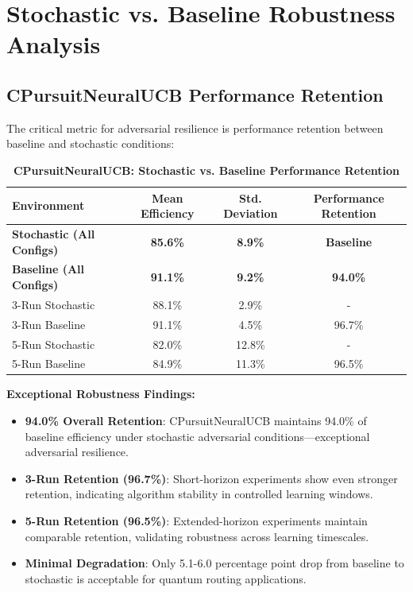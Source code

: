 \documentclass[12pt,a4paper]{article}
\newcommand{\success}[1]{\textcolor{successcolor}{\textbf{#1}}}
\begin{document}
\section{Stochastic vs. Baseline Robustness Analysis}

\subsection{CPursuitNeuralUCB Performance Retention}

The critical metric for adversarial resilience is performance retention between baseline and stochastic conditions:

\begin{table}[H]
\centering
\caption{\success{CPursuitNeuralUCB: Stochastic vs. Baseline Performance Retention}}
\begin{tabular}{|l|c|c|c|}
\hline
\textbf{Environment} & \textbf{Mean Efficiency} & \textbf{Std. Deviation} & \textbf{Performance Retention} \\
\hline
\hline
\success{Stochastic (All Configs)} & \success{85.6\%} & \success{8.9\%} & \success{Baseline} \\
\success{Baseline (All Configs)} & \success{91.1\%} & \success{9.2\%} & \success{94.0\%} \\
\midrule
3-Run Stochastic & 88.1\% & 2.9\% & - \\
3-Run Baseline & 91.1\% & 4.5\% & 96.7\% \\
5-Run Stochastic & 82.0\% & 12.8\% & - \\
5-Run Baseline & 84.9\% & 11.3\% & 96.5\% \\
\hline
\end{tabular}
\end{table}

\textbf{Exceptional Robustness Findings:}
\begin{itemize}
\item \success{94.0\% Overall Retention}: CPursuitNeuralUCB maintains 94.0\% of baseline efficiency under stochastic adversarial conditions—exceptional adversarial resilience.
\item \success{3-Run Retention (96.7\%)}: Short-horizon experiments show even stronger retention, indicating algorithm stability in controlled learning windows.
\item \success{5-Run Retention (96.5\%)}: Extended-horizon experiments maintain comparable retention, validating robustness across learning timescales.
\item \success{Minimal Degradation}: Only 5.1-6.0 percentage point drop from baseline to stochastic is acceptable for quantum routing applications.
\end{itemize}
\end{document}
